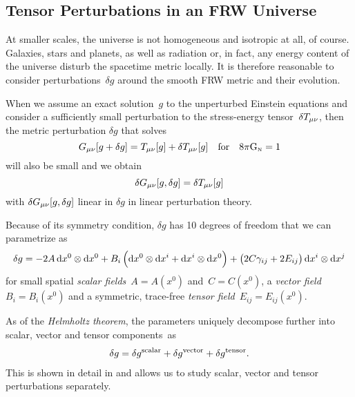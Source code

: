 \documentclass[parskip=half]{scrreprt}
\newcommand{\todocheck}[1]{\todo[color=blue!40]{#1}}
\begin{document}
\subsection{Tensor Perturbations in an FRW Universe}\label{sec:perturb}

At smaller scales, the universe is not homogeneous and isotropic at all, of course. Galaxies, stars and planets, as well as radiation or, in fact, any energy content of the universe disturb the spacetime metric locally. It is therefore reasonable to consider perturbations~\(\delta g\) around the smooth FRW metric and their evolution.

When we assume an exact solution~\(g\) to the unperturbed Einstein equations and consider a sufficiently small perturbation to the stress-energy tensor~\(\delta T_{\mu \nu}\), then the metric perturbation \(\delta g\) that solves
\begin{equation}
	G_{\mu \nu}[g + \delta g] = T_{\mu \nu}[g] + \delta T_{\mu \nu}[g] \quad \text{for} \quad 8 \pi \mathrm{G}_\textnormal{\tiny{N}} = 1
\end{equation}
will also be small  and we obtain
\begin{equation}\label{eq:perturbed_einstein_eqns}
	\delta G_{\mu \nu}[g,\delta g] = \delta T_{\mu \nu}[g]
\end{equation}
with \(\delta G_{\mu \nu}[g,\delta g]\) linear in \(\delta g\) in linear perturbation theory.

Because of its symmetry condition, \(\delta g\) has 10 degrees of freedom that we can parametrize as \citep{Schulz}
\begin{align}
	\delta g = -2A \dif{x^0}\otimes\dif{x^0} + B_i\del{\dif{x^0}\otimes\dif{x^i}+\dif{x^i}\otimes\dif{x^0}} + \del{2C\gamma_{ij} + 2E_{ij}}\dif{x^i}\otimes\dif{x^j}
\end{align}\todocheck{notation}
for small spatial \emph{scalar fields}~\(A=A(x^0)\) and~\(C=C(x^0)\), a \emph{vector field}~\(B_i=B_i(x^0)\) and a symmetric, trace-free \emph{tensor field}~\(E_{ij}=E_{ij}(x^0)\).

As of the \emph{Helmholtz theorem}, the parameters uniquely decompose further into scalar, vector and tensor components~as
\begin{align}
	\delta g = \delta g^{\mathrm{scalar}} + \delta g^{\mathrm{vector}} + \delta g^{\mathrm{tensor}} \mathpunct{.}
\end{align}
This is shown in detail in  and allows us to study scalar, vector and tensor perturbations separately. 
\end{document}
